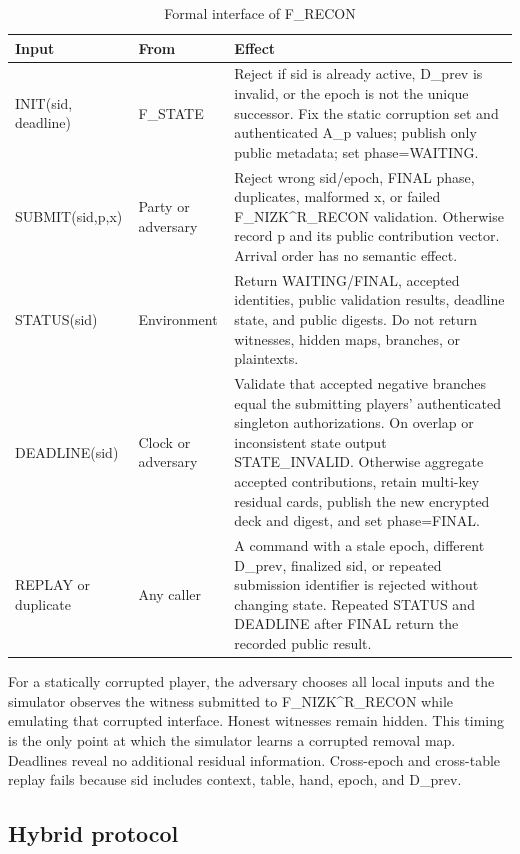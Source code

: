 \documentclass[11pt]{article}
\begin{document}
\begin{table}[htbp]
\centering
\footnotesize
\caption{Formal interface of F\_RECON}
\begin{tabularx}{\textwidth}{>{\RaggedRight}X >{\RaggedRight}X >{\RaggedRight}X}
\toprule
Input & From & Effect \\
\midrule
INIT(sid, deadline) & F\_STATE & Reject if sid is already active, D\_prev is invalid, or the epoch is not the unique successor. Fix the static corruption set and authenticated A\_p values; publish only public metadata; set phase=WAITING. \\
SUBMIT(sid,p,x) & Party or adversary & Reject wrong sid/epoch, FINAL phase, duplicates, malformed x, or failed F\_NIZK\^{}R\_RECON validation. Otherwise record p and its public contribution vector. Arrival order has no semantic effect. \\
STATUS(sid) & Environment & Return WAITING/FINAL, accepted identities, public validation results, deadline state, and public digests. Do not return witnesses, hidden maps, branches, or plaintexts. \\
DEADLINE(sid) & Clock or adversary & Validate that accepted negative branches equal the submitting players’ authenticated singleton authorizations. On overlap or inconsistent state output STATE\_INVALID. Otherwise aggregate accepted contributions, retain multi-key residual cards, publish the new encrypted deck and digest, and set phase=FINAL. \\
REPLAY or duplicate & Any caller & A command with a stale epoch, different D\_prev, finalized sid, or repeated submission identifier is rejected without changing state. Repeated STATUS and DEADLINE after FINAL return the recorded public result. \\
\bottomrule
\end{tabularx}
\end{table}

For a statically corrupted player, the adversary chooses all local inputs and the simulator observes the witness submitted to F\_NIZK\^{}R\_RECON while emulating that corrupted interface. Honest witnesses remain hidden. This timing is the only point at which the simulator learns a corrupted removal map. Deadlines reveal no additional residual information. Cross-epoch and cross-table replay fails because sid includes context, table, hand, epoch, and D\_prev.

\subsection{Hybrid protocol}
\end{document}
